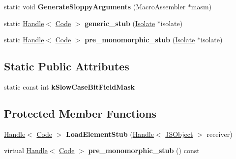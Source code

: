 \begin{DoxyCompactItemize}
\item 
\hypertarget{classv8_1_1internal_1_1_keyed_load_i_c_a26c0a36a3f7e9cd0f3ea2ffa79e0357e}{}static void {\bfseries Generate\+Sloppy\+Arguments} (Macro\+Assembler $\ast$masm)\label{classv8_1_1internal_1_1_keyed_load_i_c_a26c0a36a3f7e9cd0f3ea2ffa79e0357e}

\item 
\hypertarget{classv8_1_1internal_1_1_keyed_load_i_c_a93c640a9edf061d56fe5e3ce81956996}{}static \hyperlink{classv8_1_1internal_1_1_handle}{Handle}$<$ \hyperlink{classv8_1_1internal_1_1_code}{Code} $>$ {\bfseries generic\+\_\+stub} (\hyperlink{classv8_1_1internal_1_1_isolate}{Isolate} $\ast$isolate)\label{classv8_1_1internal_1_1_keyed_load_i_c_a93c640a9edf061d56fe5e3ce81956996}

\item 
\hypertarget{classv8_1_1internal_1_1_keyed_load_i_c_a713a742174a66f78733701ae381b6436}{}static \hyperlink{classv8_1_1internal_1_1_handle}{Handle}$<$ \hyperlink{classv8_1_1internal_1_1_code}{Code} $>$ {\bfseries pre\+\_\+monomorphic\+\_\+stub} (\hyperlink{classv8_1_1internal_1_1_isolate}{Isolate} $\ast$isolate)\label{classv8_1_1internal_1_1_keyed_load_i_c_a713a742174a66f78733701ae381b6436}

\end{DoxyCompactItemize}
\subsection*{Static Public Attributes}
\begin{DoxyCompactItemize}
\item 
static const int {\bfseries k\+Slow\+Case\+Bit\+Field\+Mask}
\end{DoxyCompactItemize}
\subsection*{Protected Member Functions}
\begin{DoxyCompactItemize}
\item 
\hypertarget{classv8_1_1internal_1_1_keyed_load_i_c_a2bc4359321dfaa59eca38159caf5def8}{}\hyperlink{classv8_1_1internal_1_1_handle}{Handle}$<$ \hyperlink{classv8_1_1internal_1_1_code}{Code} $>$ {\bfseries Load\+Element\+Stub} (\hyperlink{classv8_1_1internal_1_1_handle}{Handle}$<$ \hyperlink{classv8_1_1internal_1_1_j_s_object}{J\+S\+Object} $>$ receiver)\label{classv8_1_1internal_1_1_keyed_load_i_c_a2bc4359321dfaa59eca38159caf5def8}

\item 
\hypertarget{classv8_1_1internal_1_1_keyed_load_i_c_a1e2858983c0f33eca936bd87913e6198}{}virtual \hyperlink{classv8_1_1internal_1_1_handle}{Handle}$<$ \hyperlink{classv8_1_1internal_1_1_code}{Code} $>$ {\bfseries pre\+\_\+monomorphic\+\_\+stub} () const \label{classv8_1_1internal_1_1_keyed_load_i_c_a1e2858983c0f33eca936bd87913e6198}

\end{DoxyCompactItemize}
